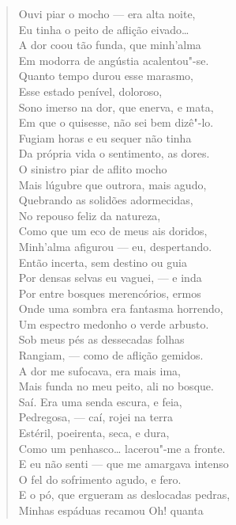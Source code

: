 \begin{verse}
Ouvi piar o mocho --- era alta noite,\\
Eu tinha o peito de aflição eivado\ldots{}\\
A dor coou tão funda, que minh'alma\\
Em modorra de angústia acalentou"-se.\\
Quanto tempo durou esse marasmo,\\
Esse estado penível, doloroso,\\
Sono imerso na dor, que enerva, e mata,\\
Em que o quisesse, não sei bem dizê"-lo.\\
Fugiam horas e eu sequer não tinha\\
Da própria vida o sentimento, as dores.\\
O sinistro piar de aflito mocho\\
Mais lúgubre que outrora, mais agudo,\\
Quebrando as solidões adormecidas,\\
No repouso feliz da natureza,\\
Como que um eco de meus ais doridos,\\
Minh'alma afigurou --- eu, despertando.\\
Então incerta, sem destino ou guia\\
Por densas selvas eu vaguei, --- e inda\\
Por entre bosques merencórios, ermos\\
Onde uma sombra era fantasma horrendo,\\
Um espectro medonho o verde arbusto.\\
Sob meus pés as dessecadas folhas\\
Rangiam, --- como de aflição gemidos.\\
A dor me sufocava, era mais ima,\\
Mais funda no meu peito, ali no bosque.\\
Saí. Era uma senda escura, e feia,\\
Pedregosa, --- caí, rojei na terra\\
Estéril, poeirenta, seca, e dura,\\
Como um penhasco\ldots{} lacerou"-me a fronte.\\
E eu não senti --- que me amargava intenso\\
O fel do sofrimento agudo, e fero.\\
E o pó, que ergueram as deslocadas pedras,\\
Minhas espáduas recamou Oh! quanta\\

\end{verse}
